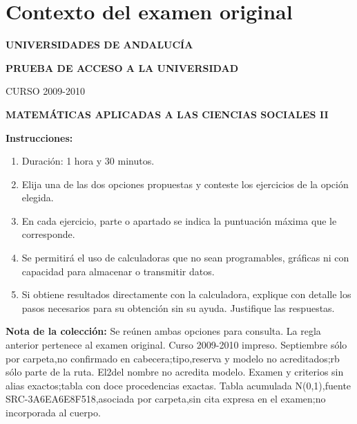 \section*{Contexto del examen original}
\textbf{UNIVERSIDADES DE ANDALUCÍA}\par
\textbf{PRUEBA DE ACCESO A LA UNIVERSIDAD}\par
CURSO 2009-2010\par
\textbf{MATEMÁTICAS APLICADAS A LAS CIENCIAS SOCIALES II}

\textbf{Instrucciones:}
\begin{enumerate}[label=\textbf{\alph*)}]
  \item Duración: 1 hora y 30 minutos.
  \item Elija una de las dos opciones propuestas y conteste los ejercicios de la opción elegida.
  \item En cada ejercicio, parte o apartado se indica la puntuación máxima que le corresponde.
  \item Se permitirá el uso de calculadoras que no sean programables, gráficas ni con capacidad para almacenar o transmitir datos.
  \item Si obtiene resultados directamente con la calculadora, explique con detalle los pasos necesarios para su obtención sin su ayuda. Justifique las respuestas.
\end{enumerate}
\noindent\textbf{Nota de la colección:} Se reúnen ambas opciones para consulta. La regla anterior pertenece al examen original. Curso 2009-2010 impreso. Septiembre sólo por carpeta,no confirmado en cabecera;tipo,reserva y modelo no acreditados;rb sólo parte de la ruta. El2del nombre no acredita modelo. Examen y criterios sin alias exactos;tabla con doce procedencias exactas. Tabla acumulada N(0,1),fuente SRC-3A6EA6E8F518,asociada por carpeta,sin cita expresa en el examen;no incorporada al cuerpo.
\par\medskip
